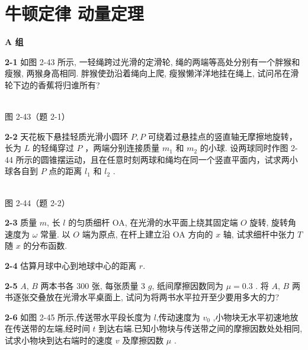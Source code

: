 \chapter{牛顿定律 动量定理}
\begin{center}\textbf{A 组}\end{center}

\textbf{2-1} 如图 2-43 所示, 一轻绳跨过光滑的定滑轮, 绳的两端等高处分别有一个胖猴和瘦猴, 两猴身高相同. 胖猴使劲沿着绳向上爬, 瘦猴懒洋洋地挂在绳上, 试问吊在滑轮下边的香蕉将归谁所有?

\begin{center}
\resizebox{0.26\textwidth}{!}{}\\[4pt]
{\small 图 2-43（题 2-1）}
\end{center}

\newpage

\textbf{2-2} 天花板下悬挂轻质光滑小圆环 $P, P$ 可绕着过悬挂点的竖直轴无摩擦地旋转，长为 $L$ 的轻绳穿过 $P$ ，两端分别连接质量 $m_{1}$ 和 $m_{2}$ 的小球. 设两球同时作图 2-44 所示的圆锥摆运动，且在任意时刻两球和绳均在同一个竖直平面内，试求两小球各自到 $P$ 点的距离 $l_{1}$ 和 $l_{2}$ .

\begin{center}
\resizebox{0.44\textwidth}{!}{}\\[4pt]
{\small 图 2-44（题 2-2）}
\end{center}

\newpage

\textbf{2-3} 质量 $m$, 长 $l$ 的匀质细杆 OA, 在光滑的水平面上绕其固定端 $O$ 旋转, 旋转角速度为 $\omega$ 常量. 以 $O$ 端为原点, 在杆上建立沿 OA 方向的 $x$ 轴, 试求细杆中张力 $T$ 随 $x$ 的分布函数.

\newpage

\textbf{2-4} 估算月球中心到地球中心的距离 $r$.

\newpage

\textbf{2-5} $A$, $B$ 两本书各 300 张, 每张质量 3 $g$, 纸间摩擦因数同为 $\mu=0.3$ . 将 $A$, $B$ 两书逐张交叠放在光滑水平桌面上, 试问为将两书水平拉开至少要用多大的力?

\newpage

\textbf{2-6} 如图 2-45 所示,传送带水平段长度为 $l$,传动速度为 $v_{0}$ ,小物块无水平初速地放在传送带的左端,经时间 $t$ 到达右端.已知小物块与传送带之间的摩擦因数处处相同,试求小物块到达右端时的速度 $v$ 及摩擦因数 $\mu$ .

